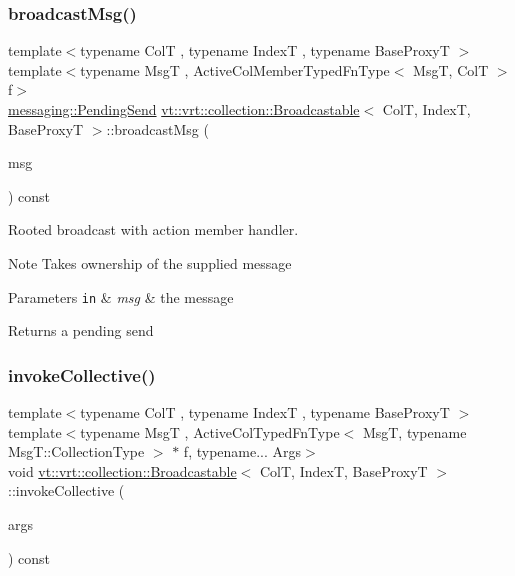 \subsubsection{\texorpdfstring{broadcast\+Msg()}{broadcastMsg()}\hspace{0.1cm}{\footnotesize\ttfamily [2/2]}}
{\footnotesize\ttfamily template$<$typename ColT , typename IndexT , typename Base\+ProxyT $>$ \\
template$<$typename MsgT , Active\+Col\+Member\+Typed\+Fn\+Type$<$ Msg\+T, Col\+T $>$ f$>$ \\
\hyperlink{structvt_1_1messaging_1_1_pending_send}{messaging\+::\+Pending\+Send} \hyperlink{structvt_1_1vrt_1_1collection_1_1_broadcastable}{vt\+::vrt\+::collection\+::\+Broadcastable}$<$ ColT, IndexT, Base\+ProxyT $>$\+::broadcast\+Msg (\begin{DoxyParamCaption}\item[{\hyperlink{structvt_1_1messaging_1_1_msg_ptr_thief}{messaging\+::\+Msg\+Ptr\+Thief}$<$ MsgT $>$}]{msg }\end{DoxyParamCaption}) const}



Rooted broadcast with action member handler. 

\begin{DoxyNote}{Note}
Takes ownership of the supplied message
\end{DoxyNote}

\begin{DoxyParams}[1]{Parameters}
\mbox{\tt in}  & {\em msg} & the message\\
\hline
\end{DoxyParams}
\begin{DoxyReturn}{Returns}
a pending send 
\end{DoxyReturn}
\mbox{\label{structvt_1_1vrt_1_1collection_1_1_broadcastable_a3acc97a928f8d184e54d696e49377008}} 
\subsubsection{\texorpdfstring{invoke\+Collective()}{invokeCollective()}\hspace{0.1cm}{\footnotesize\ttfamily [1/2]}}
{\footnotesize\ttfamily template$<$typename ColT , typename IndexT , typename Base\+ProxyT $>$ \\
template$<$typename MsgT , Active\+Col\+Typed\+Fn\+Type$<$ Msg\+T, typename Msg\+T\+::\+Collection\+Type $>$ $\ast$ f, typename... Args$>$ \\
void \hyperlink{structvt_1_1vrt_1_1collection_1_1_broadcastable}{vt\+::vrt\+::collection\+::\+Broadcastable}$<$ ColT, IndexT, Base\+ProxyT $>$\+::invoke\+Collective (\begin{DoxyParamCaption}\item[{Args \&\&...}]{args }\end{DoxyParamCaption}) const}



